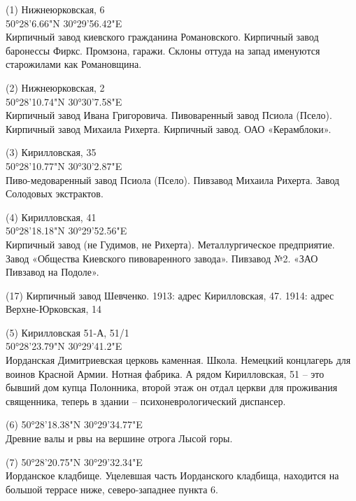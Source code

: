 \begin{flushleft}
(1) Нижнеюрковская, 6\\
 50°28'6.66"N 30°29'56.42"E\\
Кирпичный завод киевского гражданина Романовского. Кирпичный завод баронессы Фиркс. Промзона, гаражи. Склоны оттуда на запад именуются старожилами как Романовщина.

\medskip

(2) Нижнеюрковская, 2\\
50°28'10.74"N 30°30'7.58"E\\ Кирпичный завод Ивана Григоровича. Пивоваренный завод Псиола (Псело). Кирпичный завод Михаила Рихерта. Кирпичный завод. ОАО «Керамблоки».

\medskip

(3) Кирилловская, 35\\
50°28'10.77"N 30°30'2.87"E\\ Пиво-медоваренный завод Псиола (Псело). Пивзавод Михаила Рихерта. Завод Солодовых экстрактов.

\medskip

(4) Кирилловская, 41\\
50°28'18.18"N 30°29'52.56"E\\ Кирпичный завод (не Гудимов, не Рихерта). Металлургическое предприятие. Завод «Общества Киевского пивоваренного завода». Пивзавод №2. «ЗАО Пивзавод на Подоле».

\medskip

(17) Кирпичный завод Шевченко. 1913: адрес Кирилловская, 47. 1914: адрес Верхне-Юрковская, 14

\medskip
 
(5) Кирилловская 51-А, 51/1\\
50°28'23.79"N 30°29'41.2"E\\ Иорданская Димитриевская церковь каменная. Школа. Немецкий концлагерь для воинов Красной Армии. Нотная фабрика. А рядом Кирилловская, 51 – это бывший дом купца Полонника, второй этаж он отдал церкви для проживания священника, теперь в здании – психоневрологический диспансер.\\

\medskip

(6) 50°28'18.38"N 30°29'34.77"E\\
Древние валы и рвы на вершине отрога Лысой горы.\\

\medskip

(7) 50°28'20.75"N 30°29'32.34"E\\
Иорданское кладбище. Уцелевшая часть Иорданского кладбища, находится на большой террасе ниже, северо-западнее пункта 6.\\


\end{flushleft}
